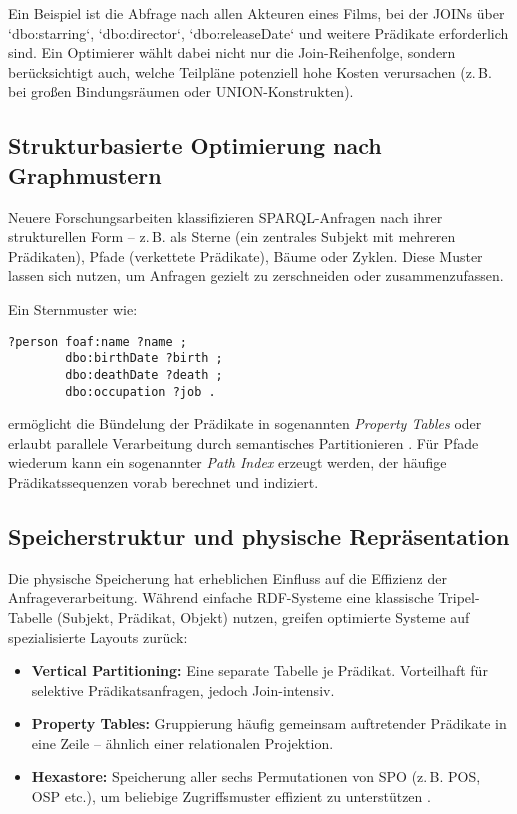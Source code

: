 \documentclass[12pt]{article}
\begin{document}
Ein Beispiel ist die Abfrage nach allen Akteuren eines Films, bei der JOINs über `dbo:starring`, `dbo:director`, `dbo:releaseDate` und weitere Prädikate erforderlich sind. Ein Optimierer wählt dabei nicht nur die Join-Reihenfolge, sondern berücksichtigt auch, welche Teilpläne potenziell hohe Kosten verursachen (z.\,B. bei großen Bindungsräumen oder UNION-Konstrukten).

\subsection{Strukturbasierte Optimierung nach Graphmustern}

Neuere Forschungsarbeiten klassifizieren SPARQL-Anfragen nach ihrer strukturellen Form – z.\,B. als Sterne (ein zentrales Subjekt mit mehreren Prädikaten), Pfade (verkettete Prädikate), Bäume oder Zyklen. Diese Muster lassen sich nutzen, um Anfragen gezielt zu zerschneiden oder zusammenzufassen.

Ein Sternmuster wie:

\begin{lstlisting}[caption=Sternförmiges SPARQL-Muster]
?person foaf:name ?name ;
        dbo:birthDate ?birth ;
        dbo:deathDate ?death ;
        dbo:occupation ?job .
\end{lstlisting}

ermöglicht die Bündelung der Prädikate in sogenannten \textit{Property Tables} oder erlaubt parallele Verarbeitung durch semantisches Partitionieren \cite{akhtar2019structure}. Für Pfade wiederum kann ein sogenannter \textit{Path Index} erzeugt werden, der häufige Prädikatssequenzen vorab berechnet und indiziert.

\subsection{Speicherstruktur und physische Repräsentation}

Die physische Speicherung hat erheblichen Einfluss auf die Effizienz der Anfrageverarbeitung. Während einfache RDF-Systeme eine klassische Tripel-Tabelle (Subjekt, Prädikat, Objekt) nutzen, greifen optimierte Systeme auf spezialisierte Layouts zurück:

\begin{itemize}
    \item \textbf{Vertical Partitioning:} Eine separate Tabelle je Prädikat. Vorteilhaft für selektive Prädikatsanfragen, jedoch Join-intensiv.
    \item \textbf{Property Tables:} Gruppierung häufig gemeinsam auftretender Prädikate in eine Zeile – ähnlich einer relationalen Projektion.
    \item \textbf{Hexastore:} Speicherung aller sechs Permutationen von SPO (z.\,B. POS, OSP etc.), um beliebige Zugriffsmuster effizient zu unterstützen \cite{weiss2008hexastore}.
\end{itemize}
\end{document}
